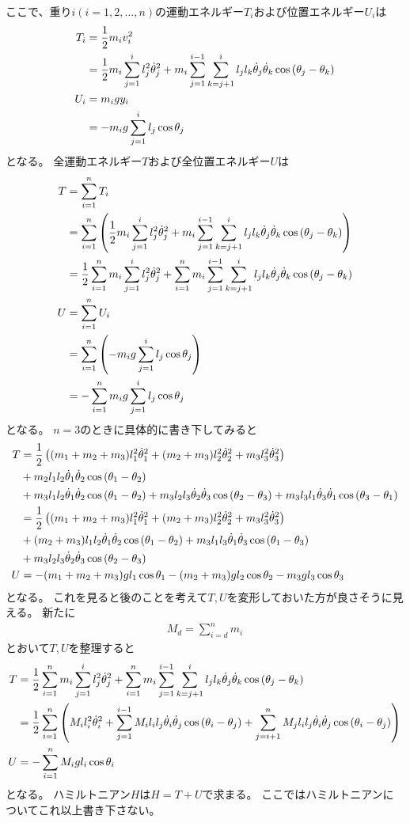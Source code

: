 \documentclass{jsarticle}
\newcommand{\eqa}[1]{\begin{align}#1\end{align}}
\newcommand{\cost}[2]{\cos\left(\theta_{#1}-\theta_{#2}\right)}
\newcommand{\dott}[1]{\dot{\theta}_{#1}}
\begin{document}
ここで、重り$i(i=1,2,\dots,n)$の運動エネルギー$T_i$および位置エネルギー$U_i$は
\eqa{
	T_i &= \frac{1}{2} m_i v_i^2 \notag\\
		&= \frac{1}{2} m_i\sum_{j=1}^i l_j^2 \dott{j}^2
			+ m_i\sum_{j=1}^{i-1} \sum_{k=j+1}^i l_j l_k \dott{j} \dott{k} \cost{j}{k} \\
	U_i &= m_i g y_i \notag\\
		&= -m_i g \sum_{j=1}^i l_j \cos\theta_j
}
となる。
全運動エネルギー$T$および全位置エネルギー$U$は
\eqa{
	T &= \sum_{i=1}^n T_i \notag\\
		&= \sum_{i=1}^n \left( \frac{1}{2} m_i\sum_{j=1}^i l_j^2 \dott{j}^2
			+ m_i\sum_{j=1}^{i-1} \sum_{k=j+1}^i l_j l_k \dott{j} \dott{k} \cost{j}{k} \right) \notag\\
		&= \frac{1}{2} \sum_{i=1}^n m_i \sum_{j=1}^i l_j^2 \dott{j}^2
			+ \sum_{i=1}^n m_i \sum_{j=1}^{i-1} \sum_{k=j+1}^i l_j l_k \dott{j} \dott{k} \cost{j}{k} \notag\\
	U &= \sum_{i=1}^n U_i \notag\\
		&= \sum_{i=1}^n \left(-m_i g \sum_{j=1}^i l_j \cos\theta_j \right) \notag\\
		&= - \sum_{i=1}^n m_i g \sum_{j=1}^i l_j \cos\theta_j
}
となる。
$n=3$のときに具体的に書き下してみると
\eqa{
	T &= \frac{1}{2} \left( (m_1 + m_2 + m_3) l_1^2 \dott{1}^2 + (m_2 + m_3) l_2^2 \dott{2}^2 + m_3 l_3^2 \dott{3}^2 \right) \notag\\
		&+ m_2 l_1 l_2 \dott{1} \dott{2} \cost{1}{2} \notag\\
		&+ m_3 l_1 l_2 \dott{1} \dott{2} \cost{1}{2} + m_3 l_2 l_3 \dott{2} \dott{3} \cost{2}{3} + m_3 l_3 l_1 \dott{3} \dott{1} \cost{3}{1} \notag\\
		&= \frac{1}{2} \left( (m_1 + m_2 + m_3) l_1^2 \dott{1}^2 + (m_2 + m_3) l_2^2 \dott{2}^2 + m_3 l_3^2 \dott{3}^2 \right) \notag\\
		&+ (m_2 + m_3) l_1 l_2 \dott{1} \dott{2} \cost{1}{2} + m_3 l_1 l_3 \dott{1} \dott{3} \cost{1}{3} \notag\\
		&+ m_3 l_2 l_3 \dott{2} \dott{3} \cost{2}{3} \notag\\
	U &= -(m_1 + m_2 + m_3) g l_1 \cos\theta_1 - (m_2 + m_3) g l_2 \cos\theta_2 - m_3 g l_3 \cos\theta_3 \notag
}
となる。
これを見ると後のことを考えて$T,U$を変形しておいた方が良さそうに見える。
新たに
\eqa{
	M_d = \sum_{i=d}^n m_i
}
とおいて$T,U$を整理すると
\eqa{
	T &= \frac{1}{2} \sum_{i=1}^n m_i \sum_{j=1}^i l_j^2 \dott{j}^2
			+ \sum_{i=1}^n m_i \sum_{j=1}^{i-1} \sum_{k=j+1}^i l_j l_k \dott{j} \dott{k} \cost{j}{k} \notag\\
		&= \frac{1}{2} \sum_{i=1}^n \left(
			M_i l_i^2 \dott{i}^2
			+ \sum_{j=1}^{i-1} M_i l_i l_j \dott{i} \dott{j} \cost{i}{j}
			+ \sum_{j=i+1}^n M_j l_i l_j \dott{i} \dott{j} \cost{i}{j}
		\right) \\
	U &= -\sum_{i=1}^n M_i g l_i \cos\theta_i
}
となる。
ハミルトニアン$H$は$H=T+U$で求まる。
ここではハミルトニアンについてこれ以上書き下さない。
\end{document}
